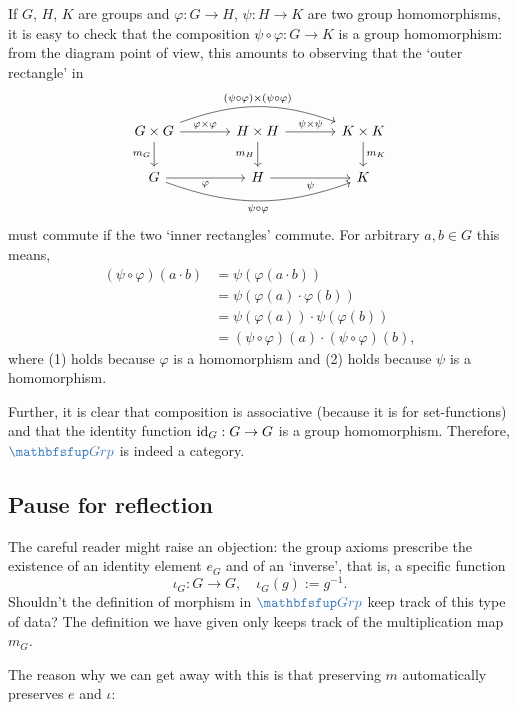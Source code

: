 If $G$, $H$, $K$ are groups and $\varphi : G \to H$, $\psi : H \to K$
are two group homomorphisms, it is easy to check that the composition
$\psi \circ \varphi : G \to K$ is a group homomorphism: from the
diagram point of view, this amounts to observing that the `outer
rectangle' in
\[
  \begin{tikzcd}[column sep=large]
    G \times G \arrow[r, "\varphi \times \varphi"] \arrow[d, "m_G"']
    \arrow[rr, bend left=20,
    "(\psi\circ\varphi)\times(\psi\circ\varphi)"] & H \times H
    \arrow[r, "\psi \times \psi"] \arrow[d, "m_H"'] &
    K \times K \arrow[d, "m_K"] \\
    G \arrow[r, "\varphi"'] \arrow[rr, bend right=20,
    "\psi\circ\varphi"'] & H \arrow[r, "\psi"'] & K
  \end{tikzcd}
\]
must commute if the two `inner rectangles' commute. For arbitrary
$a, b \in G$ this means,
\begin{align*}
  (\psi \circ \varphi)(a \cdot b) &= \psi(\varphi(a \cdot b)) \tag{1} \\
                                  &= \psi(\varphi(a) \cdot \varphi(b)) \tag{2} \\
                                  &= \psi(\varphi(a)) \cdot \psi(\varphi(b)) \\
                                  &= (\psi \circ \varphi)(a) \cdot (\psi \circ \varphi)(b),
\end{align*}
where (1) holds because $\varphi$ is a homomorphism and (2) holds
because $\psi$ is a homomorphism.

Further, it is clear that composition is associative (because it is
for set-functions) and that the identity function $\operatorname{id}_G : G \to G$ is
a group homomorphism. Therefore, $\categ{Grp}$ is indeed a category.

\subsection{Pause for reflection}
\label{subsec:groups:pause-for-reflection}
The careful reader might raise an objection: the group axioms
prescribe the existence of an identity element $e_G$ and of an
`inverse', that is, a specific function
\[
  \iota_G : G \to G, \quad \iota_G(g) := g^{-1}.
\]
Shouldn't the definition of morphism in $\categ{Grp}$ keep track of
this type of data? The definition we have given only keeps track of
the multiplication map $m_G$.

The reason why we can get away with this is that preserving $m$
automatically preserves $e$ and $\iota$:

